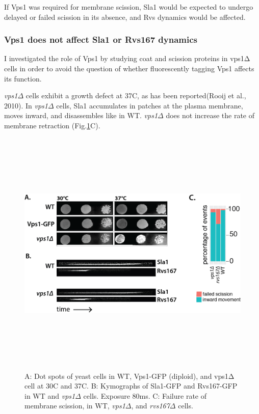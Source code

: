 \newpage
If Vps1 was required for membrane scission, Sla1 would be expected to undergo delayed or failed scission in its absence, and Rvs dynamics would be affected. 


	
			\subsubsection{Vps1 does not affect Sla1 or Rvs167 dynamics }
I investigated the role of Vps1 by studying coat and scission proteins in vps1Δ cells in order to avoid the question of whether fluorescently tagging Vps1 affects its function. 
\vspace{5mm}

\textit{vps1$\Delta$}   cells exhibit a growth defect at 37C, as has been reported(Rooij et al., 2010). In \textit{vps1$\Delta$}   cells, Sla1 accumulates in patches at the plasma membrane, moves inward, and disassembles like in WT. \textit{vps1$\Delta$}   does not increase the rate of membrane retraction  (Fig.\ref{fig4_vpsdel1}C). 

\vspace{3mm}
	\begin{figure}[H]
	\centering
	\includegraphics[width=12cm,height=12cm,keepaspectratio]{figures/results_final/vps1}
	\caption[Phenotype of \textit{vps1$\Delta$}]
	{A: Dot spots of yeast cells in WT, Vps1-GFP (diploid), and vps1Δ cell at 30C and 37C. 
		B: Kymographs of Sla1-GFP and Rvs167-GFP in WT and \textit{vps1$\Delta$} cells. Exposure 80ms.  
		C: Failure rate of membrane scission, in WT, \textit{vps1$\Delta$}, and \textit{rvs167$\Delta$}  cells. 
		\label{fig4_vpsdel1}}
\end{figure}


